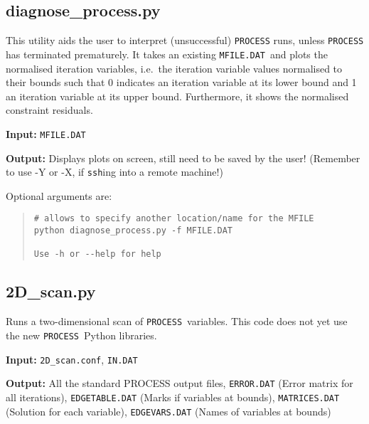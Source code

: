 \documentclass[11pt,a4paper]{report}
\newcommand{\indat}{\mbox{\texttt{IN.DAT}}}
\newcommand{\mfile}{\mbox{\texttt{MFILE.DAT}}}
\newcommand{\process}{\mbox{\texttt{PROCESS}}}
\begin{document}
\subsection{diagnose\_process.py}

This utility aids the user to interpret (unsuccessful) \process\/ runs, unless
\process\/ has terminated prematurely. It takes an existing \mfile\ and plots
the normalised iteration variables, i.e.\ the iteration variable values
normalised to their bounds such that 0 indicates an iteration variable at its
lower bound and 1 an iteration variable at its upper bound. Furthermore, it
shows the normalised constraint residuals.

\begin{description}
\item{\textbf{Input:}}
 \mfile
                                
\item{\textbf{Output:}}
  Displays plots on screen, still need to be saved by the user! (Remember to
  use -Y or -X, if \texttt{ssh}ing into a remote machine!)

\end{description}

Optional arguments are:
\begin{quote}
\begin{verbatim}
# allows to specify another location/name for the MFILE
python diagnose_process.py -f MFILE.DAT

Use -h or --help for help

\end{verbatim}
\end{quote}

\subsection{2D\_scan.py}


Runs a two-dimensional scan of \process\ variables. This code does not yet use
the new \process\ Python libraries.

\begin{description}
\item{\textbf{Input:}}
 \texttt{2D\_scan.conf}, \indat\
                                
\item{\textbf{Output:}} All the standard PROCESS output files,
  \texttt{ERROR.DAT} (Error matrix for all iterations), \texttt{EDGETABLE.DAT}
  (Marks if variables at bounds), \texttt{MATRICES.DAT} (Solution for each
  variable), \texttt{EDGEVARS.DAT} (Names of variables at bounds)
\end{description}
\end{document}
